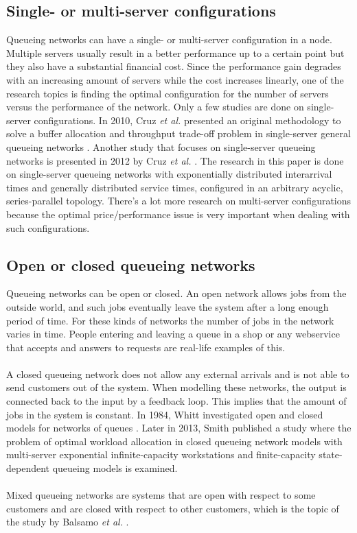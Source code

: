 \documentclass[twoside]{article}
\begin{document}
\begin{multicols}{2}
\subsection{\textbf{Single- or multi-server configurations}}
Queueing networks can have a single- or multi-server configuration in a node. Multiple servers usually result in a better performance up to a certain point but they also have a substantial financial cost. Since the performance gain degrades with an increasing amount of servers while the cost increases linearly, one of the research topics is finding the optimal configuration for the number of servers versus the performance of the network.
Only a few studies are done on single-server configurations.  In 2010, Cruz \textit{et al.} presented an original methodology to solve a buffer allocation and throughput trade-off problem in single-server general queueing networks \cite{article11}. Another study that focuses on single-server queueing networks is presented in 2012 by Cruz \textit{et al.} \cite{extracruz}. The research in this paper is done on single-server queueing networks with exponentially distributed interarrival times and generally distributed service times, configured in an arbitrary acyclic, series-parallel topology. There's a lot more research on multi-server configurations because the optimal price/performance issue is very important when dealing with such configurations. 
\subsection{\textbf{Open or closed queueing networks}}
Queueing networks can be open or closed.  An open network allows jobs from the outside world, and such jobs eventually leave the system after a long enough period of time. For these kinds of networks the number of jobs in the network varies in time. People entering and leaving a queue in a shop or any webservice that accepts and answers to requests are real-life examples of this.
\\\\
A closed queueing network does not allow any external arrivals and is not able to send customers out of the system. When modelling these networks, the output is connected back to the input by a feedback loop. This implies that the amount of jobs in the system is constant. In 1984, Whitt investigated open and closed models for networks of queues \cite{closed1}. Later in 2013, Smith published a study where the problem of optimal workload allocation in closed queueing network models with multi-server exponential infinite-capacity workstations and finite-capacity state-dependent queueing models is examined. 
\\\\
Mixed queueing networks are systems that are open with respect to some customers and are closed with respect to other customers, which is the topic of the study by Balsamo \textit{et al.} \cite{mixed}.

\end{multicols}
\end{document}
